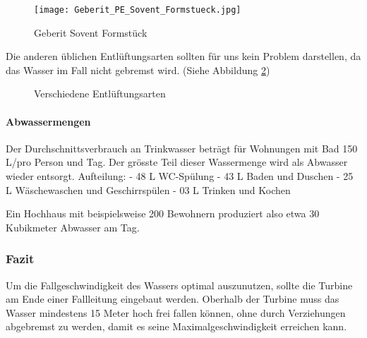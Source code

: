 \begin{figure}[H]
    \centering
    \texttt{[image: Geberit\_PE\_Sovent\_Formstueck.jpg]}
    \caption{Geberit Sovent Formstück \cite{geberit}}
	\label{fig:Sovent}
\end{figure}

Die anderen üblichen Entlüftungsarten sollten für uns kein Problem darstellen, da das Wasser im Fall nicht gebremst wird. (Siehe Abbildung \ref{fig:Entlüftungsarten})

\begin{figure}[H]
\centering
{}\;
\;
\caption{Verschiedene Entlüftungsarten \cite{docplayer}}
\label{fig:Entlüftungsarten}
\end{figure}

\paragraph{Abwassermengen}
Der Durchschnittsverbrauch an Trinkwasser beträgt für Wohnungen mit Bad 150 L/pro Person und Tag. \cite{wohnbau} Der grösste Teil dieser Wassermenge wird als Abwasser wieder entsorgt. 
\newline
Aufteilung:
\newline
- 48 L \; WC-Spülung
\newline
- 43 L \; Baden und Duschen
\newline
- 25 L \; Wäschewaschen und Geschirrspülen
\newline
- 03 L \;  Trinken und Kochen
\newline


Ein Hochhaus mit beispielsweise 200 Bewohnern produziert also etwa 30 Kubikmeter Abwasser am Tag.

\subsubsection{Fazit}
Um die Fallgeschwindigkeit des Wassers optimal auszunutzen, sollte die Turbine am Ende einer Fallleitung eingebaut werden. Oberhalb der Turbine muss das Wasser mindestens 15 Meter hoch frei fallen können, ohne durch Verziehungen abgebremst zu werden, damit es seine Maximalgeschwindigkeit erreichen kann. 


\clearpage 






